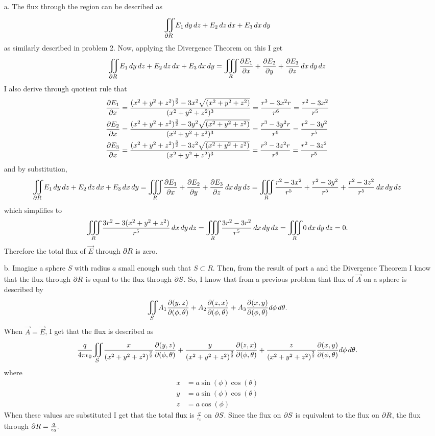 \documentclass[titlepage]{article}
\begin{document}
\begin{solution}
\begin{itemize}\vspace{-2em}
\item[a.] The flux through the region can be described as
$$ \bigiint{\p R}{}E_1\,dy\,dz + E_2\,dz\,dx + E_3\,dx\,dy $$
as similarly described in problem 2. Now, applying the Divergence Theorem on this I get
$$\bigiint{\p R}{}E_1\,dy\,dz + E_2\,dz\,dx + E_3\,dx\,dy  = \mathlarger\iiint_{R} \frac{\p E_1}{\p x} + \frac{\p E_2}{\p y} + \frac{\p E_3}{\p z}\,dx\,dy\,dz$$
I also derive through quotient rule that
\begin{align*}
\frac{\partial E_1}{\partial x} &= \frac{(x^2 + y^2 + z^2)^{\frac{3}{2}} - 3x^2\sqrt{(x^2 + y^2 + z^2)} }{(x^2 + y^2 + z^2)^3} = \frac{r^3 - 3x^2r}{r^6} = \frac{r^2 -3x^2}{r^5}\\
\frac{\partial E_2}{\partial x} &= \frac{(x^2 + y^2 + z^2)^{\frac{3}{2}} - 3y^2\sqrt{(x^2 + y^2 + z^2)} }{(x^2 + y^2 + z^2)^3} = \frac{r^3 - 3y^2r}{r^6} = \frac{r^2 -3y^2}{r^5} \\
\frac{\partial E_3}{\partial x} &= \frac{(x^2 + y^2 + z^2)^{\frac{3}{2}} - 3z^2\sqrt{(x^2 + y^2 + z^2)} }{(x^2 + y^2 + z^2)^3} = \frac{r^3 - 3z^2r}{r^6} = \frac{r^2 -3z^2}{r^5}
\end{align*}
and by substitution,
$$\bigiint{\p R}{}E_1\,dy\,dz + E_2\,dz\,dx + E_3\,dx\,dy =  \mathlarger\iiint_{R} \frac{\p E_1}{\p x} + \frac{\p E_2}{\p y} + \frac{\p E_3}{\p z}\,dx\,dy\,dz = \mathlarger\iiint_{R} \frac{r^2 -3x^2}{r^5} + \frac{r^2 -3y^2}{r^5} + \frac{r^2 -3z^2}{r^5}\,dx\,dy\,dz $$
which simplifies to
$$\mathlarger\iiint_{R} \frac{3r^2 - 3(x^2 + y^2 + z^2)}{r^5} \,dx\,dy\,dz = \mathlarger\iiint_{R} \frac{3r^2 - 3r^2}{r^5} \,dx\,dy\,dz = \mathlarger\iiint_{R} 0 \,dx\,dy\,dz = 0.$$
Therefore the total flux of $\vec{E}$ through $\partial R$ is zero.
\item[b.] Imagine a  sphere $S$ with radius $a$ small enough such that $S \subset R$. Then, from the result of part a and the Divergence Theorem I know that the flux through $\partial R$ is equal to the flux through $\partial S$. So, I know that from a previous problem that flux of $\vec{A}$ on a sphere is described by
$$ \bigiint{S}{} A_1 \frac{\p (y,z)}{\p (\phi, \theta)} + A_2 \frac{\p (z,x)}{\p (\phi, \theta)} + A_3 \frac{\p (x,y)}{\p (\phi, \theta)} d\phi\,d\theta.$$
When $\vec{A} = \vec{E}$, I get that the flux is described as 
$$\frac{q}{4\pi\epsilon_0} \bigiint{S}{} \frac{x}{\left(x^2 + y^2 + z^2\right)^{\frac{3}{2}}}\frac{\p (y,z)}{\p (\phi, \theta)} + \frac{y}{\left(x^2 + y^2 + z^2\right)^{\frac{3}{2}}} \frac{\p (z,x)}{\p (\phi, \theta)} + \frac{z}{\left(x^2 + y^2 + z^2\right)^{\frac{3}{2}}} \frac{\p (x,y)}{\p (\phi, \theta)} d\phi\,d\theta.$$
where
\begin{align*}
x  &= a\sin(\phi)\cos(\theta) \\
y &= a\sin(\phi)\cos(\theta) \\ 
z &= a\cos(\phi)
\end{align*}
When these values are substituted I get that the total flux is $\frac{q}{\epsilon_0}$ on $\partial S$. Since the flux on $\partial S$ is equivalent to the flux on $\partial R$, the flux through $\partial R = \frac{q}{\epsilon_0}.$ 
\end{itemize}
\end{solution}
\end{document}
